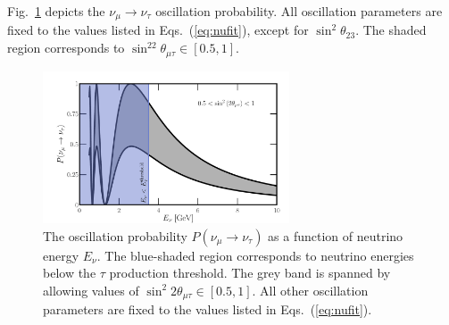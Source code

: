 \documentclass[aps,prd,onecolumn,nofootinbib,superscriptaddress, 11pt]{revtex4}
\begin{document}
Fig.~\ref{fig:osci_prob} depicts the $\nu_{\mu}\to\nu_{\tau}$ oscillation probability. All oscillation parameters are fixed to the values listed in Eqs.~(\ref{eq:nufit}), except for $\sin^2\theta_{23}$. The shaded region corresponds to $\sin^22\theta_{\mu\tau} \in [0.5,1]$. 
\begin{figure}[ht]
\centering
\includegraphics[width=0.65\textwidth]{PMuTau.pdf}
\caption{The oscillation probability $P(\nu_\mu \to \nu_\tau)$ as a function of neutrino energy $E_\nu$. The blue-shaded region corresponds to neutrino energies below the $\tau$ production threshold. The grey band is spanned by allowing values of  $\sin^2 2\theta_{\mu\tau} \in [0.5,1]$. All other oscillation parameters are fixed to the values listed in Eqs.~(\ref{eq:nufit}).}
\label{fig:osci_prob} 
\end{figure}
\end{document}
